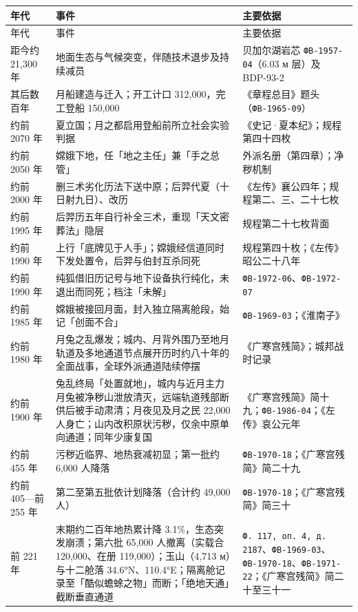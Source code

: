 \vspace{2mm}
{\footnotesize\renewcommand{\arraystretch}{1.20}
\begin{longtable}{@{}p{32mm}p{60mm}p{40mm}@{}}
\toprule
年代 & 事件 & 主要依据 \\
\midrule
\endfirsthead
\toprule
年代 & 事件 & 主要依据 \\
\midrule
\endhead
\bottomrule
\endfoot
距今约 21{,}300 年 & 地面生态与气候突变，伴随技术退步及持续减员 & 贝加尔湖岩芯 \texttt{ФВ-1957-04}（6.03 м 层）及 BDP-93-2 \\
其后数百年 & 月船建造与迁入；开工计口 312{,}000，完工登船 150{,}000 & 《章程总目》题头（\texttt{ФВ-1965-09}） \\
约前 2070 年 & 夏立国；月之都启用登船前所立社会实验判据 & 《史记·夏本纪》；规程第四十四枚 \\
约前 2050 年 & 嫦娥下地，任「地之主任」兼「手之总管」 & 外派名册（第四章）；净秽机制 \\
约前 2000 年 & 删三术劣化历法下送中原；后羿代夏（十日射九日）、改历 & 《左传》襄公四年；规程第二、三、二十七枚 \\
约前 1995 年 & 后羿历五年自行补全三术，重现「天文密葬法」隐层 & 规程第二十七枚背面 \\
约前 1990 年 & 上行「底牌见于人手」；嫦娥经信道同时下发处置令，后羿与伯封互杀同死 & 规程第四十枚；《左传》昭公二十八年 \\
约前 1990 年 & 纯狐借旧历记号与地下设备执行纯化，未退出而同死；档注「未解」 & \texttt{ФВ-1972-06}、\texttt{ФВ-1972-07} \\
约前 1985 年 & 嫦娥被接回月面，封入独立隔离舱段，始记「创面不合」 & \texttt{ФВ-1969-03}；《淮南子》 \\
约前 1980 年 & 月兔之乱爆发；城内、月背外围乃至地月轨道及多地通道节点展开历时约八十年的全面战事，全球外派通道陆续停摆 & 《广寒宫残简》；城邦战时记录 \\
约前 1900 年 & 兔乱终局「处置就地」，城内与近月主力月兔被净秽山泄放清灭，远端轨道残部断供后被手动肃清；月夜见及月之民 22{,}000 人身亡；山内改积原状污秽，仅余中原单向通道；同年少康复国 & 《广寒宫残简》简十九；\texttt{ФВ-1986-04}；《左传》哀公元年 \\
约前 455 年 & 污秽近临界、地热衰减初显；第一批约 6{,}000 人降落 & \texttt{ФВ-1970-18}；《广寒宫残简》简二十九 \\
约前 405—前 255 年 & 第二至第五批依计划降落（合计约 49{,}000 人） & \texttt{ФВ-1970-18}；《广寒宫残简》简三十 \\
前 221 年 & 末期约二百年地热累计降 3.1\%，生态突发崩溃；第六批 65{,}000 人撤离（实载合 120{,}000、在册 119{,}000）；玉山（4{,}713 м）与十二舱落 34.6°N、110.4°E；隔离舱记录至「酷似蟾蜍之物」而断；「绝地天通」截断垂直通道 & \texttt{Ф.\,117, оп.\,4, д.\,2187}、\texttt{ФВ-1969-03}、\texttt{ФВ-1970-18}、\texttt{ФВ-1971-22}；《广寒宫残简》简二十至三十一 \\

\end{longtable}}
